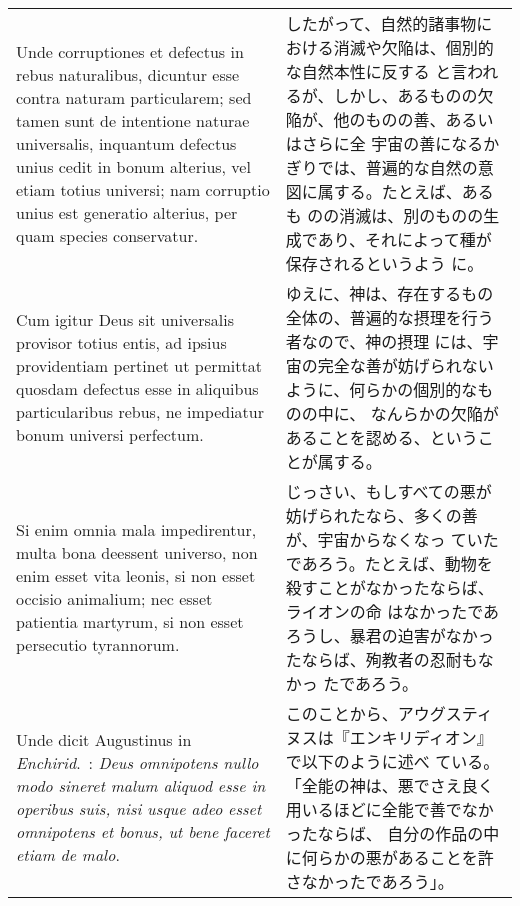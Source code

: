 \documentclass[10pt]{jsarticle} %
\begin{document}
\begin{longtable}{p{21em}p{21em}}
\\


Unde
corruptiones et defectus in rebus naturalibus, dicuntur esse contra
naturam particularem; sed tamen sunt de intentione naturae universalis,
inquantum defectus unius cedit in bonum alterius, vel etiam totius
universi; nam corruptio unius est generatio alterius, per quam species
conservatur. 

&

したがって、自然的諸事物における消滅や欠陥は、個別的な自然本性に反する
と言われるが、しかし、あるものの欠陥が、他のものの善、あるいはさらに全
宇宙の善になるかぎりでは、普遍的な自然の意図に属する。たとえば、あるも
のの消滅は、別のものの生成であり、それによって種が保存されるというよう
に。


\\


Cum igitur Deus sit universalis provisor totius entis, ad
ipsius providentiam pertinet ut permittat quosdam defectus esse in
aliquibus particularibus rebus, ne impediatur bonum universi
perfectum. 

&

ゆえに、神は、存在するもの全体の、普遍的な摂理を行う者なので、神の摂理
には、宇宙の完全な善が妨げられないように、何らかの個別的なものの中に、
なんらかの欠陥があることを認める、ということが属する。


\\

Si enim omnia mala impedirentur, multa bona deessent
universo, non enim esset vita leonis, si non esset occisio animalium;
nec esset patientia martyrum, si non esset persecutio tyrannorum. 

&

じっさい、もしすべての悪が妨げられたなら、多くの善が、宇宙からなくなっ
ていたであろう。たとえば、動物を殺すことがなかったならば、ライオンの命
はなかったであろうし、暴君の迫害がなかったならば、殉教者の忍耐もなかっ
たであろう。


\\

Unde
dicit Augustinus in {\itshape Enchirid}.~: 
{\itshape Deus omnipotens nullo modo sineret malum
aliquod esse in operibus suis, nisi usque adeo esset omnipotens et
bonus, ut bene faceret etiam de malo}.


&

このことから、アウグスティヌスは『エンキリディオン』で以下のように述べ
ている。「全能の神は、悪でさえ良く用いるほどに全能で善でなかったならば、
自分の作品の中に何らかの悪があることを許さなかったであろう」。


\end{longtable}
\end{document}
